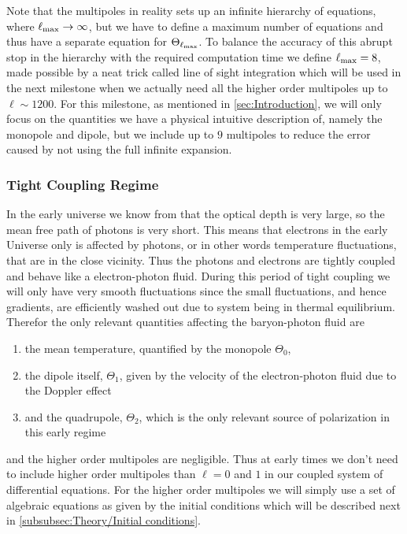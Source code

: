 \documentclass[10pt,a4paper]{article}
\begin{document}
\begin{itemize}
Note that the multipoles in reality sets up an infinite hierarchy of equations, where $\ell_{\rm{max}} \rightarrow \infty$, but we have to define a maximum number of equations and thus have a separate equation for $\Theta_{\ell_{\rm{max}}}$. To balance the accuracy of this abrupt stop in the hierarchy with the required computation time we define $\ell_{\rm{max}}=8$, made possible by a neat trick called line of sight integration which will be used in the next milestone when we actually need all the higher order multipoles up to $\ell \sim 1200$. For this milestone, as mentioned in \cref{sec:Introduction}, we will only focus on the quantities we have a physical intuitive description of, namely the monopole and dipole, but we include up to $9$ multipoles to reduce the error caused by not using the full infinite expansion.

\end{itemize}

\subsubsection{Tight Coupling Regime}
\label{subsubsec:Theory/Tight Coupling}
In the early universe we know from \cite{milestone2} that the optical depth is very large, so the mean free path of photons is very short. This means that electrons in the early Universe only is affected by photons, or in other words temperature fluctuations, that are in the close vicinity. Thus the photons and electrons are tightly coupled and behave like a electron-photon fluid. During this period of tight coupling we will only have very smooth fluctuations since the small fluctuations, and hence gradients, are efficiently washed out due to system being in thermal equilibrium. Therefor the only relevant quantities affecting the baryon-photon fluid are
\begin{enumerate}
\item the mean temperature, quantified by the monopole $\Theta_0$,
\item the dipole itself,  $\Theta_1$, given by the velocity of the electron-photon fluid due to the Doppler effect
\item and the quadrupole, $\Theta_2$, which is the only relevant source of polarization in this early regime
\end{enumerate}
and the higher order multipoles are negligible. Thus at early times we don't need to include higher order multipoles than $\ell = 0$ and $1$ in our coupled system of differential equations. For the higher order multipoles we will simply use a set of algebraic equations as given by the initial conditions which will be described next in \cref{subsubsec:Theory/Initial conditions}.
\end{document}

